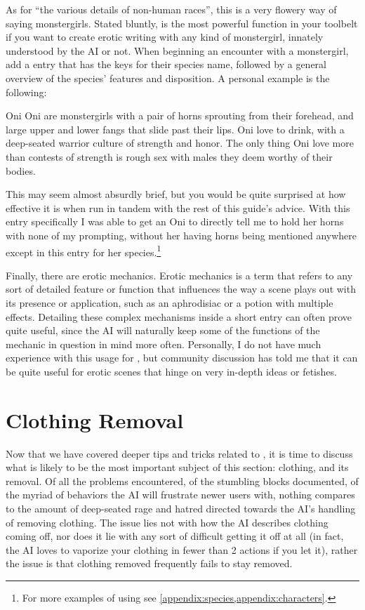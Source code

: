 \documentclass[Coomer-main.tex]{subfiles}
\begin{document}
As for “the various details of non-human races”, this is a very flowery way of saying monstergirls.
Stated bluntly, \wi is the most powerful function in your toolbelt if you want to create erotic writing with any kind of monstergirl, innately understood by the AI or not.
When beginning an encounter with a monstergirl, add a \wi entry that has the keys for their species name, followed by a general overview of the species’ features and disposition.
A personal example is the following:

\begin{WI}{Oni}
Oni are monstergirls with a pair of horns sprouting from their forehead, and large upper and lower fangs that slide past their lips.
Oni love to drink, with a deep-seated warrior culture of strength and honor.
The only thing Oni love more than contests of strength is rough sex with males they deem worthy of their bodies.
\end{WI}
This may seem almost absurdly brief, but you would be quite surprised at how effective it is when run in tandem with the rest of this guide’s advice.
With this entry specifically I was able to get an Oni to directly tell me to hold her horns with none of my prompting, without her having horns being mentioned anywhere except in this \wi entry for her species.\footnote{For more examples of using \wi see \cref{appendix:species,appendix:characters}.}

Finally, there are erotic mechanics.
Erotic mechanics is a term that refers to any sort of detailed feature or function that influences the way a scene plays out with its presence or application, such as an aphrodisiac or a potion with multiple effects.
Detailing these complex mechanisms inside a short \wi entry can often prove quite useful, since the AI will naturally keep some of the functions of the mechanic in question in mind more often.
Personally, I do not have much experience with this usage for \wi, but community discussion has told me that it can be quite useful for erotic scenes that hinge on very in-depth ideas or fetishes.

\section{Clothing Removal}

Now that we have covered deeper tips and tricks related to \wi, it is time to discuss what is likely to be the most important subject of this section: clothing, and its removal.
Of all the problems encountered, of the stumbling blocks documented, of the myriad of behaviors the AI will frustrate newer users with, nothing compares to the amount of deep-seated rage and hatred directed towards the AI’s handling of removing clothing.
The issue lies not with how the AI describes clothing coming off, nor does it lie with any sort of difficult getting it off at all (in fact, the AI loves to vaporize your clothing in fewer than 2 actions if you let it), rather the issue is that clothing removed frequently fails to stay removed.
\end{document}
